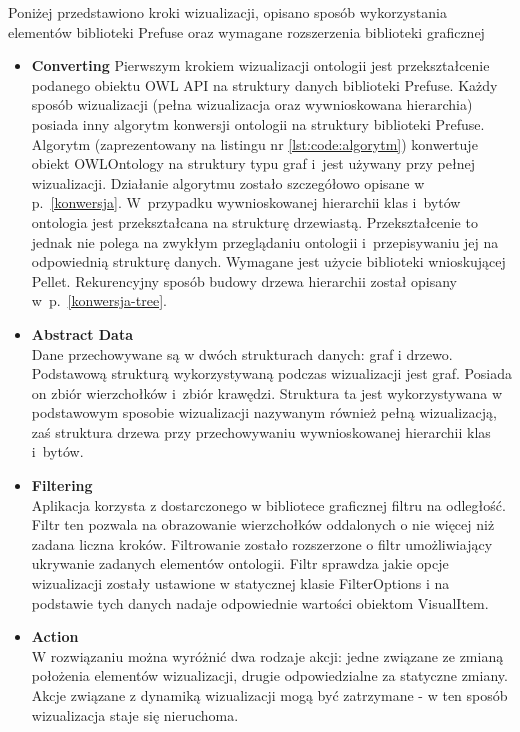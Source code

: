 
Poniżej przedstawiono kroki wizualizacji, opisano sposób wykorzystania elementów biblioteki Prefuse oraz wymagane rozszerzenia biblioteki graficznej


\begin{itemize}
 \item{\bf Converting} 
Pierwszym krokiem wizualizacji ontologii jest przekształcenie podanego obiektu OWL API na struktury danych biblioteki Prefuse. Każdy sposób wizualizacji (pełna wizualizacja oraz
wywnioskowana hierarchia) posiada inny algorytm konwersji ontologii na struktury biblioteki Prefuse.  Algorytm (zaprezentowany na listingu nr \ref{lst:code:algorytm}) konwertuje
obiekt OWLOntology na struktury typu graf i~jest używany przy pełnej wizualizacji. Działanie algorytmu zostało szczegółowo opisane w p.~\ref{konwersja}. W~przypadku
wywnioskowanej hierarchii klas i~bytów ontologia jest przekształcana na strukturę drzewiastą. Przekształcenie to jednak nie polega na zwykłym przeglądaniu ontologii 
i~przepisywaniu jej na odpowiednią strukturę danych. Wymagane jest użycie biblioteki wnioskującej Pellet. Rekurencyjny sposób budowy drzewa hierarchii  został opisany 
w~p.~\ref{konwersja-tree}.




 \item {\bf Abstract Data } \\
Dane przechowywane są w dwóch strukturach danych: graf i drzewo. Podstawową strukturą wykorzystywaną podczas wizualizacji jest graf. Posiada on zbiór wierzchołków 
i~zbiór krawędzi. Struktura ta jest wykorzystywana w podstawowym sposobie wizualizacji nazywanym również pełną wizualizacją, zaś struktura drzewa przy 
przechowywaniu wywnioskowanej hierarchii klas i~bytów. 

\item {\bf Filtering} \\
 Aplikacja korzysta z dostarczonego w bibliotece graficznej filtru na odległość. Filtr ten pozwala na obrazowanie wierzchołków oddalonych o nie więcej niż zadana
liczna kroków. Filtrowanie zostało rozszerzone o filtr umożliwiający ukrywanie zadanych elementów ontologii. Filtr sprawdza jakie opcje wizualizacji zostały
 ustawione w statycznej klasie  FilterOptions i na podstawie tych danych nadaje odpowiednie wartości obiektom VisualItem.
\item {\bf Action}\\
W rozwiązaniu można wyróżnić dwa rodzaje akcji: jedne związane ze zmianą położenia elementów wizualizacji, drugie odpowiedzialne za statyczne zmiany. Akcje związane 
z dynamiką wizualizacji mogą być zatrzymane  - w ten sposób wizualizacja staje się nieruchoma.  


\end{itemize}
